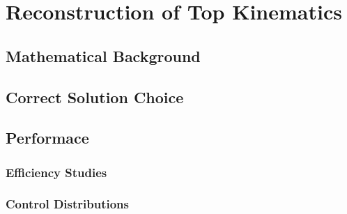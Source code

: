\chapter{Reconstruction of Top Kinematics}

\section{Mathematical Background}

\section{Correct Solution Choice}

\section{Performace}
\subsection{Efficiency Studies}
\subsection{Control Distributions}
